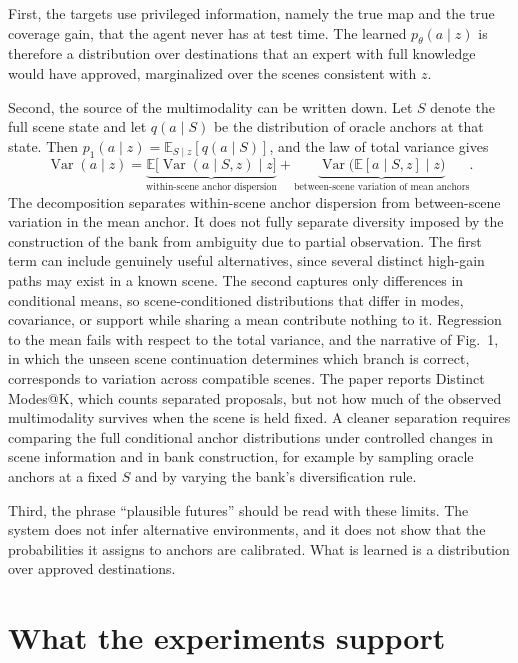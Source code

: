 \documentclass[11pt]{article}
\theoremstyle{plain}
\theoremstyle{remark}
\newcommand{\E}{\mathbb E}
\begin{document}
First, the targets use privileged information, namely the true map and the true coverage gain, that the agent never has at test time. The learned $p_\theta(a\mid z)$ is therefore a distribution over destinations that an expert with full knowledge would have approved, marginalized over the scenes consistent with $z$.

Second, the source of the multimodality can be written down. Let $S$ denote the full scene state and let $q(a\mid S)$ be the distribution of oracle anchors at that state. Then $p_1(a\mid z)=\E_{S\mid z}[q(a\mid S)]$, and the law of total variance gives
\[
\operatorname{Var}(a\mid z)=\underbrace{\E\big[\operatorname{Var}(a\mid S,z)\mid z\big]}_{\text{within-scene anchor dispersion}}+\underbrace{\operatorname{Var}\big(\E[a\mid S,z]\mid z\big)}_{\text{between-scene variation of mean anchors}} .
\]
The decomposition separates within-scene anchor dispersion from between-scene variation in the mean anchor. It does not fully separate diversity imposed by the construction of the bank from ambiguity due to partial observation. The first term can include genuinely useful alternatives, since several distinct high-gain paths may exist in a known scene. The second captures only differences in conditional means, so scene-conditioned distributions that differ in modes, covariance, or support while sharing a mean contribute nothing to it. Regression to the mean fails with respect to the total variance, and the narrative of Fig.~1, in which the unseen scene continuation determines which branch is correct, corresponds to variation across compatible scenes. The paper reports Distinct Modes@K, which counts separated proposals, but not how much of the observed multimodality survives when the scene is held fixed. A cleaner separation requires comparing the full conditional anchor distributions under controlled changes in scene information and in bank construction, for example by sampling oracle anchors at a fixed $S$ and by varying the bank's diversification rule.

Third, the phrase ``plausible futures'' should be read with these limits. The system does not infer alternative environments, and it does not show that the probabilities it assigns to anchors are calibrated. What is learned is a distribution over approved destinations.

\section{What the experiments support}\label{sec:evidence}
\end{document}
